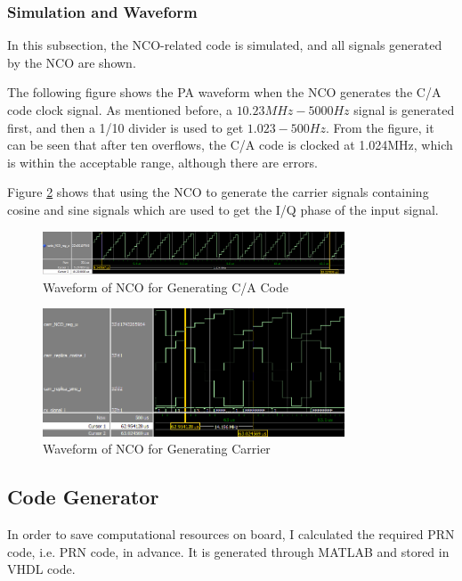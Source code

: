 \subsubsection{Simulation and Waveform}
In this subsection, the NCO-related code is simulated, and all signals generated by the NCO are shown.

The following figure shows the PA waveform when the NCO generates the C/A code clock signal. As mentioned before, a $10.23MHz-\num{5000}Hz$ signal is generated first, and then a 1/10 divider is used to get $1.023-500Hz$. From the figure, it can be seen that after ten overflows, the C/A code is clocked at 1.024MHz, which is within the acceptable range, although there are errors.

Figure \ref{fig:nco_carrier_wave} shows that using the NCO to generate the carrier signals containing cosine and sine signals which are used to get the I/Q phase of the input signal.

\begin{figure}[!htbp]
    \centering
    \includegraphics[width=0.8\textwidth]{_IMAGES/nco_code_wave.png}
    \caption{Waveform of NCO for Generating C/A Code}
    \label{fig:nco_code_wave}
\end{figure}

\begin{figure}[!htbp]
    \centering
    \includegraphics[width=0.8\textwidth]{_IMAGES/nco_carrier_wave.png}
    \caption{Waveform of NCO for Generating Carrier}
    \label{fig:nco_carrier_wave}
\end{figure}

\subsection{Code Generator}
In order to save computational resources on board, I calculated the required PRN code, i.e. PRN  code, in advance. It is generated through MATLAB and stored in VHDL code.

